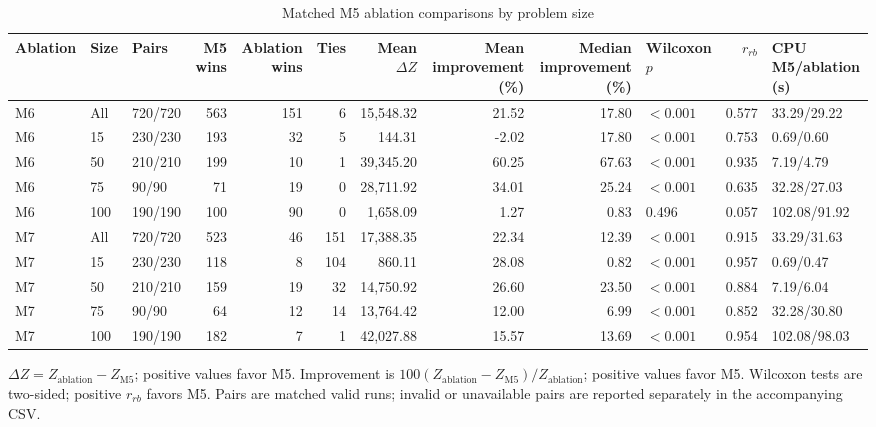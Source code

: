\begin{table}[htbp]
\centering
\caption{Matched M5 ablation comparisons by problem size}
\label{tab:m5_ablation_comparison}
\scriptsize
\setlength{\tabcolsep}{3pt}
\begin{tabular}{lllrrrrrrlrl}
\toprule
Ablation & Size & Pairs & M5 wins & Ablation wins & Ties & Mean $\Delta Z$ & Mean improvement (\%) & Median improvement (\%) & Wilcoxon $p$ & $r_{rb}$ & CPU M5/ablation (s) \\
\midrule
M6 & All & 720/720 & 563 & 151 & 6 & 15,548.32 & 21.52 & 17.80 & $<0.001$ & 0.577 & 33.29/29.22 \\
M6 & 15 & 230/230 & 193 & 32 & 5 & 144.31 & -2.02 & 17.80 & $<0.001$ & 0.753 & 0.69/0.60 \\
M6 & 50 & 210/210 & 199 & 10 & 1 & 39,345.20 & 60.25 & 67.63 & $<0.001$ & 0.935 & 7.19/4.79 \\
M6 & 75 & 90/90 & 71 & 19 & 0 & 28,711.92 & 34.01 & 25.24 & $<0.001$ & 0.635 & 32.28/27.03 \\
M6 & 100 & 190/190 & 100 & 90 & 0 & 1,658.09 & 1.27 & 0.83 & 0.496 & 0.057 & 102.08/91.92 \\
M7 & All & 720/720 & 523 & 46 & 151 & 17,388.35 & 22.34 & 12.39 & $<0.001$ & 0.915 & 33.29/31.63 \\
M7 & 15 & 230/230 & 118 & 8 & 104 & 860.11 & 28.08 & 0.82 & $<0.001$ & 0.957 & 0.69/0.47 \\
M7 & 50 & 210/210 & 159 & 19 & 32 & 14,750.92 & 26.60 & 23.50 & $<0.001$ & 0.884 & 7.19/6.04 \\
M7 & 75 & 90/90 & 64 & 12 & 14 & 13,764.42 & 12.00 & 6.99 & $<0.001$ & 0.852 & 32.28/30.80 \\
M7 & 100 & 190/190 & 182 & 7 & 1 & 42,027.88 & 15.57 & 13.69 & $<0.001$ & 0.954 & 102.08/98.03 \\
\bottomrule
\end{tabular}
\end{table}
\noindent\footnotesize $\Delta Z=Z_{\mathrm{ablation}}-Z_{\mathrm{M5}}$; positive values favor M5. Improvement is $100(Z_{\mathrm{ablation}}-Z_{\mathrm{M5}})/Z_{\mathrm{ablation}}$; positive values favor M5. Wilcoxon tests are two-sided; positive $r_{rb}$ favors M5. Pairs are matched valid runs; invalid or unavailable pairs are reported separately in the accompanying CSV.
